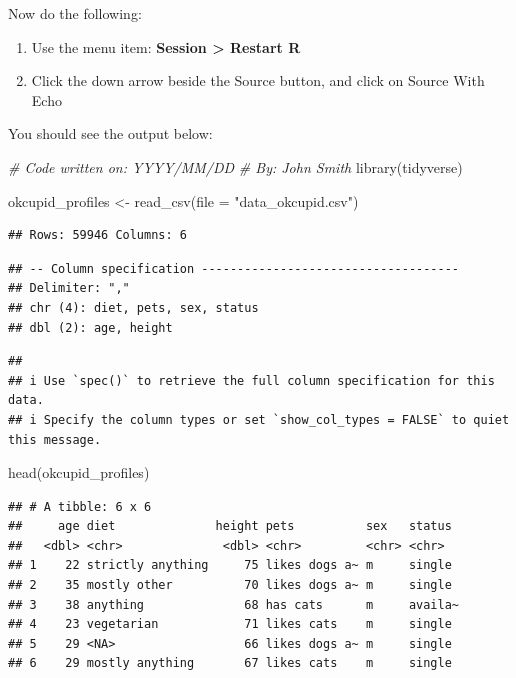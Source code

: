 \documentclass[
]{krantz}
\makeatletter
\newenvironment{Shaded}{\begin{snugshade}}{\end{snugshade}}
\newcommand{\AttributeTok}[1]{\textcolor[rgb]{0.61,0.61,0.61}{#1}}
\newcommand{\CommentTok}[1]{\textcolor[rgb]{0.37,0.37,0.37}{\textit{#1}}}
\newcommand{\FunctionTok}[1]{\textcolor[rgb]{0,0,0}{#1}}
\newcommand{\NormalTok}[1]{#1}
\newcommand{\OtherTok}[1]{\textcolor[rgb]{0.37,0.37,0.37}{#1}}
\newcommand{\StringTok}[1]{\textcolor[rgb]{0.5,0.5,0.5}{#1}}
\providecommand{\tightlist}{%
  \setlength{\itemsep}{0pt}\setlength{\parskip}{0pt}}
\newenvironment{kframe}{%
\medskip{}
\setlength{\fboxsep}{.8em}
 \def\at@end@of@kframe{}%
 \ifinner\ifhmode%
  \def\at@end@of@kframe{\end{minipage}}%
  \begin{minipage}{\columnwidth}%
 \fi\fi%
 \def\FrameCommand##1{\hskip\@totalleftmargin \hskip-\fboxsep
 \colorbox{shadecolor}{##1}\hskip-\fboxsep
     \hskip-\linewidth \hskip-\@totalleftmargin \hskip\columnwidth}%
 \MakeFramed {\advance\hsize-\width
   \@totalleftmargin\z@ \linewidth\hsize
   \@setminipage}}%
 {\par\unskip\endMakeFramed%
 \at@end@of@kframe}
\renewenvironment{Shaded}{\begin{kframe}}{\end{kframe}}
\makeatother
\begin{document}
Now do the following:

\begin{enumerate}
\def\labelenumi{\arabic{enumi}.}
\tightlist
\item
  Use the menu item: \textbf{Session \textgreater{} Restart R}
\item
  Click the down arrow beside the Source button, and click on Source With Echo
\end{enumerate}

You should see the output below:

\begin{Shaded}
\begin{Highlighting}[]
\CommentTok{\# Code written on: YYYY/MM/DD }
\CommentTok{\# By: John Smith}
\FunctionTok{library}\NormalTok{(tidyverse)}

\NormalTok{okcupid\_profiles }\OtherTok{\textless{}{-}} \FunctionTok{read\_csv}\NormalTok{(}\AttributeTok{file =} \StringTok{"data\_okcupid.csv"}\NormalTok{)}
\end{Highlighting}
\end{Shaded}

\begin{verbatim}
## Rows: 59946 Columns: 6
\end{verbatim}

\begin{verbatim}
## -- Column specification ------------------------------------
## Delimiter: ","
## chr (4): diet, pets, sex, status
## dbl (2): age, height
\end{verbatim}

\begin{verbatim}
## 
## i Use `spec()` to retrieve the full column specification for this data.
## i Specify the column types or set `show_col_types = FALSE` to quiet this message.
\end{verbatim}

\begin{Shaded}
\begin{Highlighting}[]
\FunctionTok{head}\NormalTok{(okcupid\_profiles)}
\end{Highlighting}
\end{Shaded}

\begin{verbatim}
## # A tibble: 6 x 6
##     age diet              height pets          sex   status 
##   <dbl> <chr>              <dbl> <chr>         <chr> <chr>  
## 1    22 strictly anything     75 likes dogs a~ m     single 
## 2    35 mostly other          70 likes dogs a~ m     single 
## 3    38 anything              68 has cats      m     availa~
## 4    23 vegetarian            71 likes cats    m     single 
## 5    29 <NA>                  66 likes dogs a~ m     single 
## 6    29 mostly anything       67 likes cats    m     single
\end{verbatim}
\end{document}
